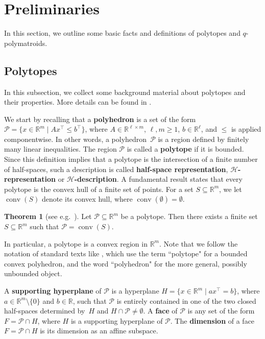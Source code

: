 \documentclass[a4paper,11pt,reqno]{amsart}
\theoremstyle{definition}
\newtheorem{theorem}{Theorem}[section]
\newcommand{\mP}{\mathcal{P}}
\newcommand{\R}{\mathbb R}
\DeclareMathOperator{\conv}{conv}
\begin{document}
\section{Preliminaries}\label{sec: prelims}

In this section, we outline some basic facts and definitions of polytopes and $q$-polymatroids. 


{\subsection{Polytopes} In this subsection, we collect some background material about polytopes and their properties.
More details can be found in \cite{grunbaum1967convex,ziegler2012lectures}.


We start by recalling that a \textbf{polyhedron} is a set of the form $\mP=\{x \in \R^m \mid A  x^\top \le b^\top \}$, where $A \in \R^{\ell \times m}$, $\ell,m \ge 1$, $b \in \R^\ell$, and $\le$ is applied componentwise. In other words, a polyhedron~$\mP$ is a region defined by finitely many linear inequalities. The region $\mP$ is called a \textbf{polytope} if it is bounded. 
Since this definition implies that a polytope is the intersection of a finite number of half-spaces, such a description is called \textbf{half-space representation}, \textbf{$\mathcal{H}$-representation} or \textbf{$\mathcal{H}$-description}.
A fundamental result states that every polytope is the convex hull of a finite set of points. For a set $S \subseteq \R^m$, we let $\conv(S)$ denote its convex hull, where $\conv(\emptyset)=\emptyset$.


\begin{theorem}[see e.g.~\cite{grunbaum1967convex}]\label{thm:fundamental_poly}
Let $\mP \subseteq \R^m$ be a polytope. Then there exists a finite set $S \subseteq \R^m$ such that $\mP=\conv(S)$.
\end{theorem}
In particular, a polytope is a convex region in $\R^m$. Note that we follow the notation of standard texts like \cite{grunbaum1967convex, ziegler2012lectures}, which use the term ``polytope" for a bounded convex polyhedron, and the word ``polyhedron" for the more general, possibly unbounded object.



A \textbf{supporting hyperplane} of $\mP$ is a hyperplane $H = \{x \in \R^m \mid a x^\top = b\}$, where $a \in \R^m \setminus \{0\}$ and $b \in \R$, such that $\mP$ is entirely contained in one of the two closed half-spaces determined by~$H$ and $H \cap \mP \neq \emptyset$. A \textbf{face} of $\mP$ is any set of the form $F = \mP \cap H$, where $H$ is a supporting hyperplane of $\mP$. The \textbf{dimension} of a face $F = \mathcal{P} \cap H$ is its dimension as an affine subspace.


}
\end{document}
